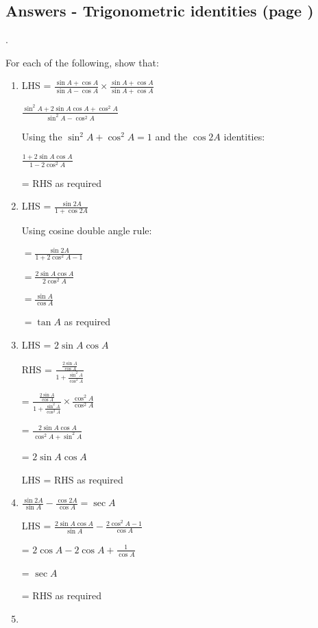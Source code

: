 \documentclass[../main.tex]{subfiles}
\begin{document}
\subsection*{Answers - Trigonometric identities (page \pageref{Trig identities})}
\label{Trig identities answers}.

For each of the following, show that:
\begin{enumerate}
    \item LHS = $\frac{\sin{A}+\cos{A}}{\sin{A}-\cos{A}}\times \frac{\sin{A}+\cos{A}}{\sin{A}+\cos{A}}$

    $\frac{\sin^2{A}+2\sin{A}\cos{A}+\cos^2{A}}{\sin^2{A}-\cos^2{A}}$

    Using the $\sin^2{A}+\cos^2{A}=1$ and the $\cos{2A}$ identities:

    $\frac{1+2\sin{A}\cos{A}}{1-2\cos^2{A}}$
    
    = RHS as required

    \item LHS = $\frac{\sin{2A}}{1+\cos{2A}}$

    Using cosine double angle rule:

    $ = \frac{\sin{2A}}{1+2\cos^2{A}-1}$

    $ = \frac{2\sin{A}\cos{A}}{2\cos^2{A}}$

    $ = \frac{\sin{A}}{\cos{A}}$

    $ = \tan{A}$ as required

    
    \item LHS = $2\sin{A}\cos{A}$

    RHS = $\frac{\frac{2\sin{A}}{\cos{A}}}{1+\frac{\sin^2{A}}{\cos^2{A}}}$

    = $\frac{\frac{2\sin{A}}{\cos{A}}}{1+\frac{\sin^2{A}}{\cos^2{A}}}\times \frac{\cos^2{A}}{\cos^2{A}}$

    = $\frac{2\sin{A}\cos{A}}{\cos^2{A}+\sin^2{A}}$

    = $2\sin{A}\cos{A}$
    
    LHS = RHS as required

    \item $\frac{\sin{2A}}{\sin{A}}-\frac{\cos{2A}}{\cos{A}}=\sec{A}$
    
    LHS = $\frac{2\sin{A}\cos{A}}{\sin{A}}-\frac{2\cos^2{A}-1}{\cos{A}}$

    = $2\cos{A}-2\cos{A}+\frac{1}{\cos{A}}$

    = $\sec{A}$
    
    = RHS as required
    
    \item 
    

\end{enumerate}
\end{document}
